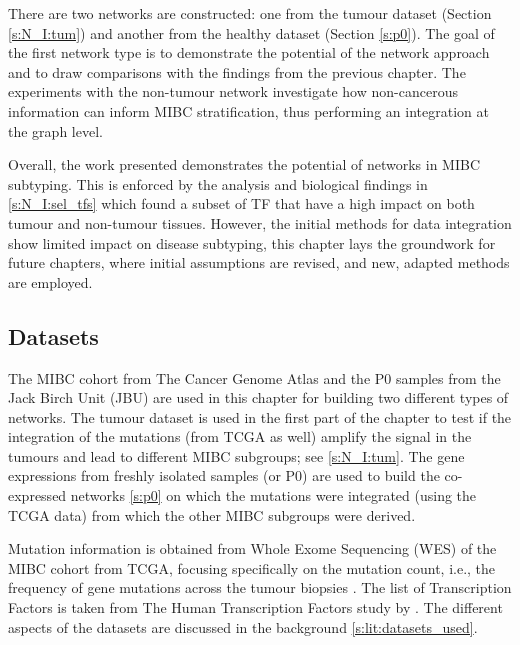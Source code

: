 There are two networks are constructed: one from the tumour dataset (Section \ref{s:N_I:tum}) and another from the healthy dataset (Section \ref{s:p0}). The goal of the first network type is to demonstrate the potential of the network approach and to draw comparisons with the findings from the previous chapter. The experiments with the non-tumour network investigate how non-cancerous information can inform MIBC stratification, thus performing an integration at the graph level.

Overall, the work presented demonstrates the potential of networks in MIBC subtyping. This is enforced by the analysis and biological findings in \cref{s:N_I:sel_tfs} which found a subset of TF that have a high impact on both tumour and non-tumour tissues. However, the initial methods for data integration show limited impact on disease subtyping, this chapter lays the groundwork for future chapters, where initial assumptions are revised, and new, adapted methods are employed.



\subsection*{Datasets}

The MIBC cohort from The Cancer Genome Atlas \citep{Tcga2018-sj} and the P0 samples from the Jack Birch Unit (JBU) are used in this chapter for building two different types of networks. The tumour dataset is used in the first part of the chapter to test if the integration of the mutations (from TCGA as well) amplify the signal in the tumours and lead to different MIBC subgroups; see \cref{s:N_I:tum}. The gene expressions from freshly isolated samples (or P0) are used to build the co-expressed networks \cref{s:p0} on which the mutations were integrated (using the TCGA data) from which the other MIBC subgroups were derived.

Mutation information is obtained from Whole Exome Sequencing (WES) of the MIBC cohort from TCGA, focusing specifically on the mutation count, i.e., the frequency of gene mutations across the tumour biopsies . The list of Transcription Factors is taken from The Human Transcription Factors study by \citet{Lambert2018-el}. The different aspects of the datasets are discussed in the background \cref{s:lit:datasets_used}.




